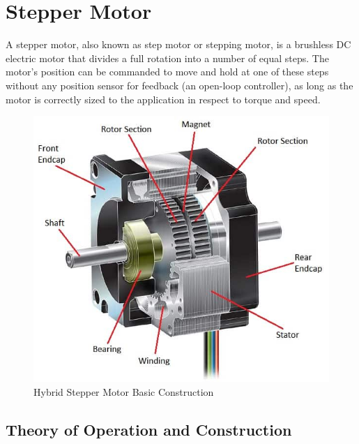 \documentclass[journal]{IEEEtran}
\begin{document}
\section{Stepper Motor}




A stepper motor, also known as step motor or stepping motor, is a brushless DC electric motor that divides a full rotation into a number of equal steps. The motor's position can be commanded to move and hold at one of these steps without any position sensor for feedback (an open-loop controller), as long as the motor is correctly sized to the application in respect to torque and speed.\cite{wikipedia_stepper}


\begin{figure}[!h]
    \centering
    \includegraphics[scale=0.33]{Stepper/stepper1.png}
    \caption{Hybrid Stepper Motor Basic Construction}
    \label{fig:Stepper Construction}
\end{figure}


\subsection{Theory of Operation and Construction}
\end{document}
